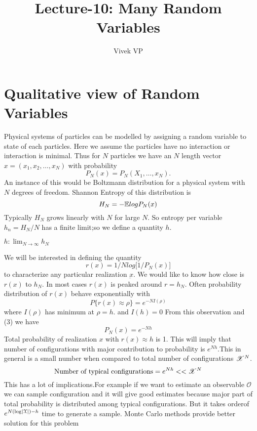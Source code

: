 \documentclass[letterpaper,english,10pt]{article}
\title{Lecture-10: Many Random Variables}
\author{Vivek VP}
\begin{document}
\maketitle
\section{Qualitative view of Random Variables}
Physical systems of particles can be modelled by assigning a random variable to state of each particles. Here we assume the particles have no interaction or interaction is minimal. Thus for $N$ particles we have an $N$ length vector $x = (x_1,x_2,\dots ,x_N)$ with probability 
\begin{equation}
  P_N(x) = P_N(X_1,\dots ,x_N) .
\end{equation}
An instance of this would be Boltzmann distribution for a physical system with $N$ degrees of freedom. Shannon Entropy of this distribution is 
  \begin{equation}
      H_N = -\mathbb{E} {log P_N(x) }
  \end{equation}
  Typically $H_N$ grows linearly with $N$ for large $N$. So entropy per variable $h_n=H_N/N$ has a finite limit;so we define a quantity $h$.
  
 \begin{defn}
 	$h: \lim_{N\to\infty} h_N$
 \end{defn}
  We will be interested in defining the quantity 
  \begin{equation}
      r(x) = 1/N log \big[ 1/P_N(x)\big]
  \end{equation}
  to characterize any particular realization $\underbar{x}$. We would like to know how close is $r(x)$ to $h_N$. In most cases $r(x)$ is peaked around $r=h_N$. Often probability distribution of $r(x)$ behave exponentially with 
  \begin{equation}
   P\lbrace r(x) \approx \rho \rbrace=e^{-NI(\rho)}
   \end{equation}
   where
   $I(\rho)$ has minimum at $\rho = h$.
   and $I(h)=0$
   From this observation and (3) we have 
   \begin{equation}
       P_N(x) = e^{-Nh}
   \end{equation}
   Total probability of realization $x$ with $r(x) \approx h$ is 1. This will imply that number of configurations with major contribution to probability is $e^{Nh}. $This in general is a  small number when compared to total number of configurations $\mathscr{X}^N$. 
   \begin{equation}
   	\text{Number of typical configurations}=e^{Nh}<<\mathscr{X}^N
   \end{equation}
   This has a lot of implications.For example if we want to estimate an observable $\mathcal{O}$ we can sample configuration and it will give good estimates because major part of total probability is distributed among typical configurations. But it takes orderof $e^{N(\log\left\lvert\mathcal{X}\right\rvert)-h}$ time to generate a sample. Monte Carlo methods provide better solution for this problem
\end{document}
